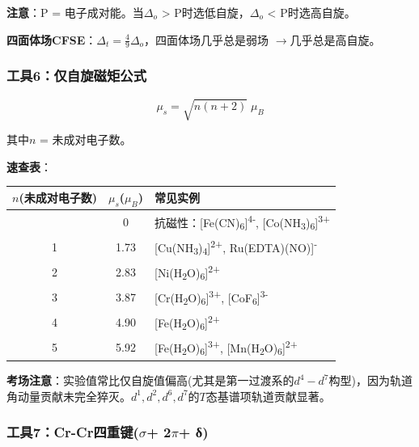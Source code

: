 \documentclass[a4paper,11pt]{ctexart}
\newcounter{none}
\newcommand{\箭}{\ensuremath{\rightarrow}}
\newcommand{\左箭}{\ensuremath{\leftarrow}}
\newcommand{\上箭}{\ensuremath{\uparrow}}
\newcommand{\下箭}{\ensuremath{\downarrow}}
\newcommand{\衡}{\ensuremath{\rightleftharpoons}}
\newcommand{\双箭}{\ensuremath{\leftrightarrow}}
\newcommand{\约等于}{\ensuremath{\approx}}
\newcommand{\小于等于}{\ensuremath{\leq}}
\newcommand{\大于等于}{\ensuremath{\geq}}
\newcommand{\不等于}{\ensuremath{\neq}}
\newcommand{\西格马}{\ensuremath{\sigma}}
\newcommand{\派}{\ensuremath{\pi}}
\begin{document}
\textbf{注意}：P = 电子成对能。当\(\Delta_o\) \textgreater{} P时选低自旋，\(\Delta_o\) \textless{} P时选高自旋。

\textbf{四面体场CFSE}：\(\Delta_t = \frac{4}{9}\Delta_o\)，四面体场几乎总是弱场 \箭 几乎总是高自旋。

\subsubsection{工具6：仅自旋磁矩公式}\label{ux5de5ux51776ux4ec5ux81eaux65cbux78c1ux77e9ux516cux5f0f}

\[\boxed{\mu_s = \sqrt{n(n+2)} \;\mu_B}\]

其中\(n\) = 未成对电子数。

\textbf{速查表}：

{\def\LTcaptype{none} %
\begin{longtable}[]{@{}ccl@{}}
\toprule\noalign{}
\(n\)(未成对电子数) & \(\mu_s\)(\(\mu_B\)) & 常见实例 \\
\midrule\noalign{}
\endhead
\bottomrule\noalign{}
\endlastfoot
0 & 0 & 抗磁性：{[}Fe(CN)\textsubscript{6}{]}\textsuperscript{4-}, {[}Co(NH\textsubscript{3})\textsubscript{6}{]}\textsuperscript{3+} \\
1 & 1.73 & {[}Cu(NH\textsubscript{3})\textsubscript{4}{]}\textsuperscript{2+}, Ru(EDTA)(NO){]}\textsuperscript{-} \\
2 & 2.83 & {[}Ni(H\textsubscript{2}O)\textsubscript{6}{]}\textsuperscript{2+} \\
3 & 3.87 & {[}Cr(H\textsubscript{2}O)\textsubscript{6}{]}\textsuperscript{3+}, {[}CoF\textsubscript{6}{]}\textsuperscript{3-} \\
4 & 4.90 & {[}Fe(H\textsubscript{2}O)\textsubscript{6}{]}\textsuperscript{2+} \\
5 & 5.92 & {[}Fe(H\textsubscript{2}O)\textsubscript{6}{]}\textsuperscript{3+}, {[}Mn(H\textsubscript{2}O)\textsubscript{6}{]}\textsuperscript{2+} \\
\end{longtable}
}

\textbf{考场注意}：实验值常比仅自旋值偏高(尤其是第一过渡系的\(d^4-d^7\)构型)，因为轨道角动量贡献未完全猝灭。\(d^1, d^2, d^6, d^7\)的\(T\)态基谱项轨道贡献显著。

\subsubsection{\texorpdfstring{工具7：Cr-Cr四重键(\西格马 + 2\派 + δ)}{工具7：Cr-Cr四重键(+ 2+ δ)}}\label{ux5de5ux51777cr-crux56dbux91cdux952e-2-ux3b4}
\end{document}
